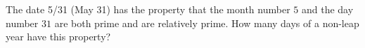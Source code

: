 The date 5/31 (May 31) has the property that the month number $5$ and the day number $31$ are both prime and are relatively prime. How many days of a non-leap year have this property?
